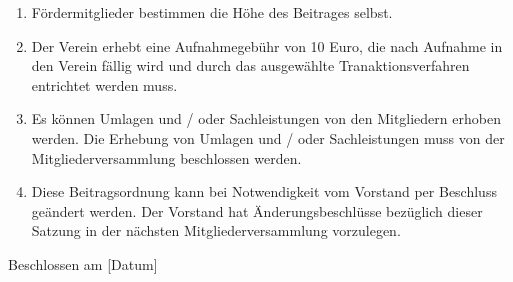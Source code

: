 \documentclass[a4paper,ngerman]{scrartcl}
\begin{document}
\begin{enumerate}
\item Fördermitglieder bestimmen die Höhe des Beitrages selbst.
\item Der Verein erhebt eine Aufnahmegebühr von 10 Euro, die nach Aufnahme in den Verein fällig wird und durch das ausgewählte Tranaktionsverfahren entrichtet werden muss.
\item Es können Umlagen und / oder Sachleistungen von den Mitgliedern erhoben werden. Die Erhebung von Umlagen und / oder Sachleistungen muss von der Mitgliederversammlung beschlossen werden.
\item Diese Beitragsordnung kann bei Notwendigkeit vom Vorstand per Beschluss geändert werden. Der Vorstand hat Änderungsbeschlüsse bezüglich dieser Satzung in der nächsten Mitgliederversammlung vorzulegen.
\end{enumerate}


Beschlossen am [Datum]
\end{document}
